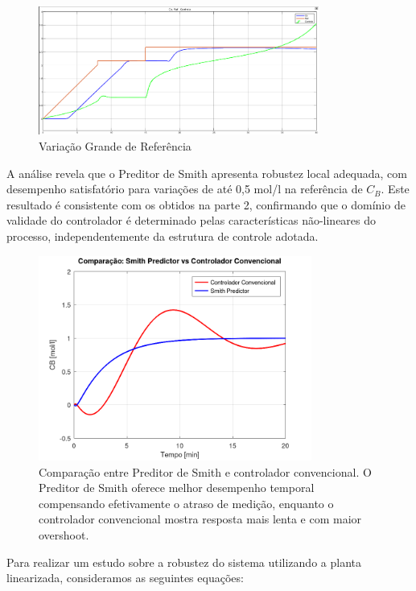 \documentclass[a4paper,12pt]{article}
\begin{document}
\begin{figure}[H]
  \centering
  \includegraphics[width=0.82\textwidth]{figure8.png}
  \caption{Variação Grande de Referência}
  \end{figure}

A análise revela que o Preditor de Smith apresenta robustez local adequada, com desempenho satisfatório para variações de até 0,5 mol/l na referência de $C_B$. Este resultado é consistente com os obtidos na parte 2, confirmando que o domínio de validade do controlador é determinado pelas características não-lineares do processo, independentemente da estrutura de controle adotada.

\begin{figure}[H]
    \centering
    \includegraphics[width=0.8\textwidth]{figura_questao2_smith_predictor.png}
    \caption{Comparação entre Preditor de Smith e controlador convencional. O Preditor de Smith oferece melhor desempenho temporal compensando efetivamente o atraso de medição, enquanto o controlador convencional mostra resposta mais lenta e com maior overshoot.}
    \label{fig:smith_predictor_comparison}
\end{figure}

Para realizar um estudo sobre a robustez do sistema utilizando a planta linearizada, consideramos as seguintes equações:
\end{document}
